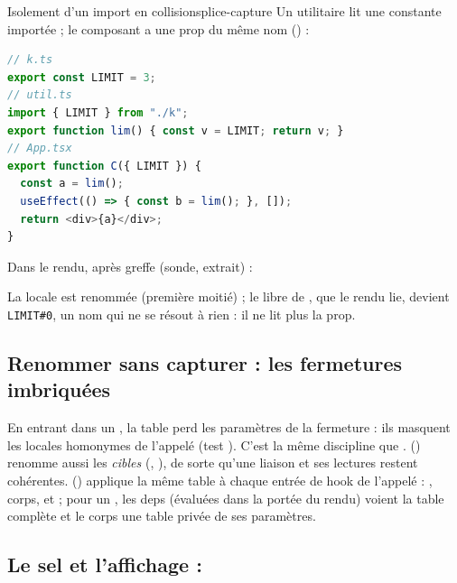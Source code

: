 \begin{exemple}{Isolement d'un import en collision}{splice-capture}
Un utilitaire lit une constante importée ; le composant a une prop du même nom () :
\begin{lstlisting}[language=TypeScript]
// k.ts
export const LIMIT = 3;
// util.ts
import { LIMIT } from "./k";
export function lim() { const v = LIMIT; return v; }
// App.tsx
export function C({ LIMIT }) {
  const a = lim();
  useEffect(() => { const b = lim(); }, []);
  return <div>{a}</div>;
}
\end{lstlisting}
Dans le rendu, après greffe (sonde, extrait) :
La locale  est renommée (première moitié) ; le  libre de , que le rendu lie, devient \texttt{LIMIT\#0}, un nom qui ne se résout à rien : il ne lit plus la prop.
\end{exemple}

\subsection{Renommer sans capturer : les fermetures imbriquées}


En entrant dans un , la table perd les paramètres de la fermeture : ils masquent les locales homonymes de l'appelé (test ). C'est la même discipline que .  () renomme aussi les \emph{cibles} (, ), de sorte qu'une liaison et ses lectures restent cohérentes.  () applique la même table à chaque entrée de hook de l'appelé : , corps,  et  ; pour un , les deps (évaluées dans la portée du rendu) voient la table complète et le corps une table privée de ses paramètres.

\subsection{Le sel et l'affichage : \texorpdfstring{}{SPLICE\_MARK}}

